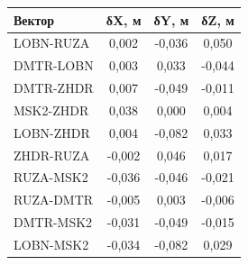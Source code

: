 \begin{table} [htbp]
{\begin{subtable}{.47\linewidth}
\begin{tabular}{ l
					S[table-number-alignment = center]
					S[table-number-alignment = center]
					S[table-number-alignment = center] }
				
				\hline
				\textbf{Вектор}				& \textbf{δX, м}	& \textbf{δY, м}	& \textbf{δZ, м}	\\ \hline
				LOBN-RUZA					&      0,002		& 	  -0,036		&      0,050		\\ %
				DMTR-LOBN					&      0,003		&      0,033		&     -0,044		\\ %
				DMTR-ZHDR					&      0,007		&     -0,049		&     -0,011		\\ %
				MSK2-ZHDR					&      0,038		&      0,000		&      0,004		\\ %
				LOBN-ZHDR					&      0,004		&     -0,082		&      0,033		\\ %
				ZHDR-RUZA					&     -0,002		&      0,046		&      0,017		\\ %
				RUZA-MSK2					&     -0,036		&     -0,046		&     -0,021		\\ %
				RUZA-DMTR					&     -0,005		&      0,003		&     -0,006		\\ %
				DMTR-MSK2					&     -0,031		&     -0,049		&     -0,015		\\ %
				LOBN-MSK2					&     -0,034		&     -0,082		&      0,029		\\ \hline
				
				
			\end{tabular}
		\end{subtable}%
	}
\end{table}		

